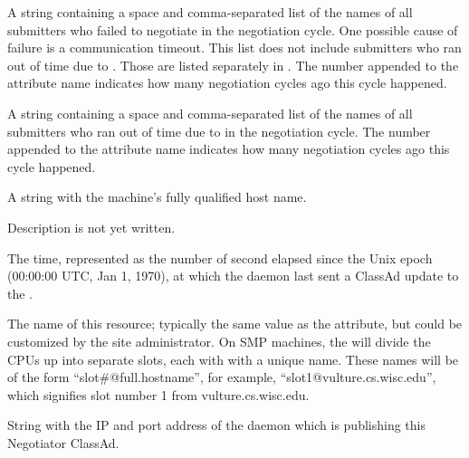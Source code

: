 \begin{description}
\item[\AdAttr{LastNegotiationCycleSubmittersFailed<X>}:] A string containing
  a space and comma-separated list of the names of all submitters who
  failed to negotiate in the negotiation cycle.  One possible cause of
  failure is a communication timeout.  This list does not include
  submitters who ran out of time due
  to .  Those are listed
  separately in .
  The number  appended to the attribute name indicates how
  many negotiation cycles ago this cycle happened.

\item[\AdAttr{LastNegotiationCycleSubmittersOutOfTime<X>}:] A string containing
  a space and comma-separated list of the names of all submitters who
  ran out of time due to 
  in the negotiation cycle.  The number  appended to the
  attribute name indicates how many negotiation cycles ago this cycle
  happened.
\item[\AdAttr{Machine}:] A string with the machine's fully qualified 
  host name.

\item[\AdAttr{MyAddress}:] Description is not yet written.

\item[\AdAttr{MyCurrentTime}:]  The time, represented as the number of 
  second elapsed since the Unix epoch (00:00:00 UTC, Jan 1, 1970),
  at which the  daemon last sent a ClassAd update to the
  .

\item[\AdAttr{Name}:] The name of this resource; typically the same value as
  the  attribute, but could be customized by the site
  administrator.
  On SMP machines, the  will divide the CPUs up into separate
  slots, each with with a unique name.
  These names will be of the form ``slot\#@full.hostname'', for example,
  ``slot1@vulture.cs.wisc.edu'', which signifies slot number 1 from
  vulture.cs.wisc.edu.

\item[\AdAttr{NegotiatorIpAddr}:] String with the IP and port address of the
 daemon which is publishing this Negotiator ClassAd.


\end{description}
